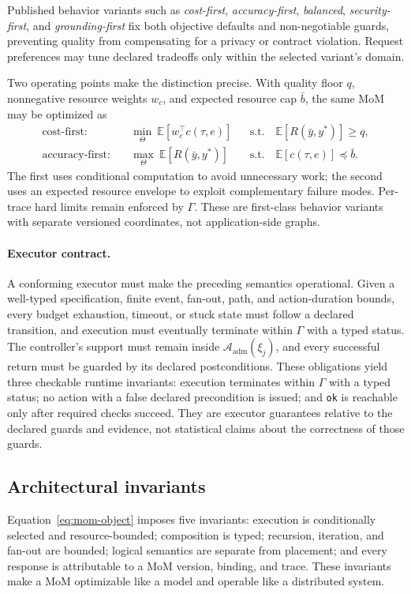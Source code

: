 Published behavior variants such as \emph{cost-first}, \emph{accuracy-first},
\emph{balanced}, \emph{security-first}, and \emph{grounding-first} fix both
objective defaults and non-negotiable guards, preventing quality from
compensating for a privacy or contract violation. Request preferences may tune
declared tradeoffs only within the selected variant's domain.

Two operating points make the distinction precise. With quality floor $q$,
nonnegative resource weights $w_c$, and expected resource cap $\bar b$, the
same MoM may be optimized as
\begin{equation}
\begin{aligned}
 \text{cost-first:}\quad
 &\min_{\Theta}\ \mathbb{E}[w_c^{\top}c(\tau,e)]
 &&\text{s.t.}\quad \mathbb{E}[R(\bar y,y^*)]\ge q,\\
 \text{accuracy-first:}\quad
 &\max_{\Theta}\ \mathbb{E}[R(\bar y,y^*)]
 &&\text{s.t.}\quad \mathbb{E}[c(\tau,e)]\preceq \bar b.
\end{aligned}
\label{eq:dual-profiles}
\end{equation}
The first uses conditional computation to avoid unnecessary work; the second
uses an expected resource envelope to exploit complementary failure modes.
Per-trace hard limits remain enforced by $\Gamma$. These are first-class
behavior variants with separate versioned coordinates, not application-side
graphs.

\paragraph{Executor contract.}
A conforming executor must make the preceding semantics operational. Given a
well-typed specification, finite event, fan-out, path, and action-duration
bounds, every budget exhaustion, timeout, or stuck state must follow a declared
transition, and execution must eventually terminate within $\Gamma$ with a
typed status. The controller's support must remain inside
$\mathcal{A}_{\mathrm{adm}}(\xi_j)$, and every successful return must be guarded
by its declared postconditions. These obligations yield three checkable runtime
invariants: execution terminates within $\Gamma$ with a typed status; no action
with a false declared precondition is issued; and \texttt{ok} is reachable only
after required checks succeed. They are executor guarantees relative to the
declared guards and evidence, not statistical claims about the correctness of
those guards.

\subsection{Architectural invariants}

Equation~\ref{eq:mom-object} imposes five invariants: execution is
conditionally selected and resource-bounded;
composition is typed; recursion, iteration, and fan-out are bounded; logical
semantics are separate from placement; and every response is attributable to a
MoM version, binding, and trace. These invariants make a MoM optimizable like a
model and operable like a distributed system.
